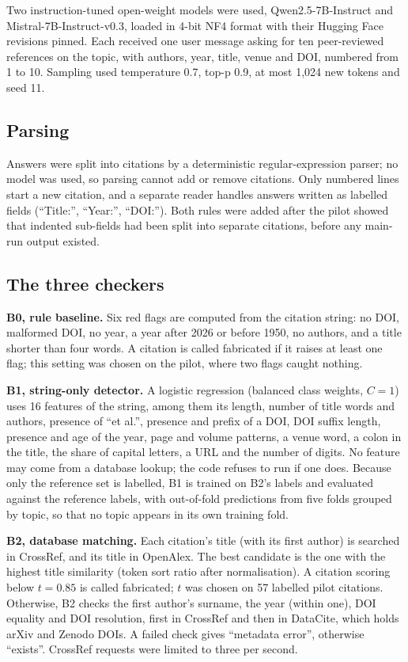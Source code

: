 \documentclass[10pt,twocolumn]{article}
\begin{document}
Two instruction-tuned open-weight models were used, Qwen2.5-7B-Instruct and Mistral-7B-Instruct-v0.3, loaded in 4-bit NF4 format with their Hugging Face revisions pinned. Each received one user message asking for ten peer-reviewed references on the topic, with authors, year, title, venue and DOI, numbered from 1 to 10. Sampling used temperature 0.7, top-p 0.9, at most 1,024 new tokens and seed 11.

\subsection{Parsing}
Answers were split into citations by a deterministic regular-expression parser; no model was used, so parsing cannot add or remove citations. Only numbered lines start a new citation, and a separate reader handles answers written as labelled fields (``Title:'', ``Year:'', ``DOI:''). Both rules were added after the pilot showed that indented sub-fields had been split into separate citations, before any main-run output existed.

\subsection{The three checkers}
\textbf{B0, rule baseline.} Six red flags are computed from the citation string: no DOI, malformed DOI, no year, a year after 2026 or before 1950, no authors, and a title shorter than four words. A citation is called fabricated if it raises at least one flag; this setting was chosen on the pilot, where two flags caught nothing.

\textbf{B1, string-only detector.} A logistic regression (balanced class weights, $C=1$) uses 16 features of the string, among them its length, number of title words and authors, presence of ``et al.'', presence and prefix of a DOI, DOI suffix length, presence and age of the year, page and volume patterns, a venue word, a colon in the title, the share of capital letters, a URL and the number of digits. No feature may come from a database lookup; the code refuses to run if one does. Because only the reference set is labelled, B1 is trained on B2's labels and evaluated against the reference labels, with out-of-fold predictions from five folds grouped by topic, so that no topic appears in its own training fold.

\textbf{B2, database matching.} Each citation's title (with its first author) is searched in CrossRef, and its title in OpenAlex. The best candidate is the one with the highest title similarity (token sort ratio after normalisation). A citation scoring below $t=0.85$ is called fabricated; $t$ was chosen on 57 labelled pilot citations. Otherwise, B2 checks the first author's surname, the year (within one), DOI equality and DOI resolution, first in CrossRef and then in DataCite, which holds arXiv and Zenodo DOIs. A failed check gives ``metadata error'', otherwise ``exists''. CrossRef requests were limited to three per second.
\end{document}

